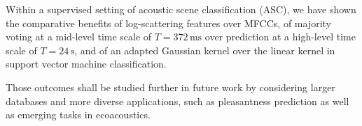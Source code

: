 \documentclass[journal]{IEEEtran}
\newcommand{\ja}[1]{\textcolor{magenta}{Joakim : #1}}
\begin{document}
Within a supervised setting of acoustic scene classification (ASC), we have shown the comparative benefits of log-scattering features over MFCCs, of majority voting at a mid-level time scale of $T=372\,\mathrm{ms}$ over prediction at a high-level time scale of $T=24\,\mathrm{s}$, and of an adapted Gaussian kernel over the linear kernel in support vector machine classification.

Those outcomes shall be studied further in future work by considering larger databases and more diverse applications, such as pleasantness prediction \cite{lafaySoundscapePilot, lafayPartI} as well as emerging tasks in ecoacoustics.




% 










\end{document}
